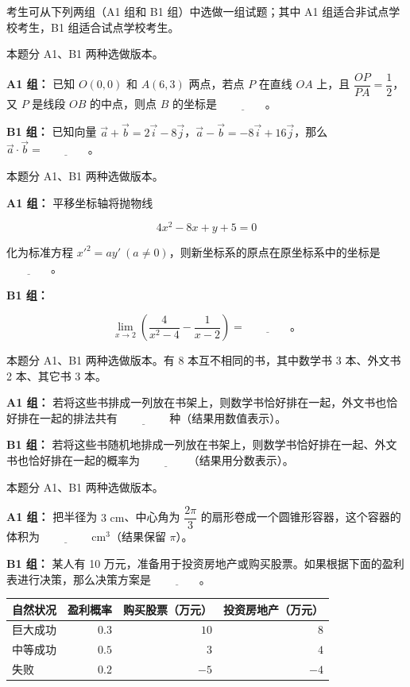 考生可从下列两组（A1 组和 B1 组）中选做一组试题；其中 A1 组适合非试点学校考生，B1 组适合试点学校考生。

\begin{question}
本题分 A1、B1 两种选做版本。

\textbf{A1 组：} 已知 $O(0,0)$ 和 $A(6,3)$ 两点，若点 $P$ 在直线 $OA$ 上，且 $\dfrac{OP}{PA}=\dfrac12$，又 $P$ 是线段 $OB$ 的中点，则点 $B$ 的坐标是 $\underline{\qquad\qquad}$。

\textbf{B1 组：} 已知向量 $\vec a+\vec b=2\vec i-8\vec j$，$\vec a-\vec b=-8\vec i+16\vec j$，那么 $\vec a\cdot\vec b=\underline{\qquad\qquad}$。

\end{question}
\begin{question}
本题分 A1、B1 两种选做版本。

\textbf{A1 组：} 平移坐标轴将抛物线

\nopagebreak[4]
\[
4x^2-8x+y+5=0
\]

化为标准方程 $x'^2=ay'\ (a\ne0)$，则新坐标系的原点在原坐标系中的坐标是 $\underline{\qquad\qquad}$。

\textbf{B1 组：}

\nopagebreak[4]
\[
\lim_{x\to2}\left(\dfrac{4}{x^2-4}-\dfrac{1}{x-2}\right)=\underline{\qquad\qquad}\text{。}
\]

\end{question}
\begin{question}
本题分 A1、B1 两种选做版本。有 8 本互不相同的书，其中数学书 3 本、外文书 2 本、其它书 3 本。

\textbf{A1 组：} 若将这些书排成一列放在书架上，则数学书恰好排在一起，外文书也恰好排在一起的排法共有 $\underline{\qquad\qquad}$ 种（结果用数值表示）。

\textbf{B1 组：} 若将这些书随机地排成一列放在书架上，则数学书恰好排在一起、外文书也恰好排在一起的概率为 $\underline{\qquad\qquad}$（结果用分数表示）。

\end{question}
\begin{question}
本题分 A1、B1 两种选做版本。

\textbf{A1 组：} 把半径为 $3\text{ cm}$、中心角为 $\dfrac{2\pi}{3}$ 的扇形卷成一个圆锥形容器，这个容器的体积为 $\underline{\qquad\qquad}\text{ cm}^3$（结果保留 $\pi$）。

\textbf{B1 组：} 某人有 10 万元，准备用于投资房地产或购买股票。如果根据下面的盈利表进行决策，那么决策方案是 $\underline{\qquad\qquad}$。

\begin{center}
\begin{tabular}{lrrr}
\toprule
自然状况 & 盈利概率 & 购买股票（万元） & 投资房地产（万元） \\
\midrule
巨大成功 & $0.3$ & $10$ & $8$ \\
中等成功 & $0.5$ & $3$ & $4$ \\
失败 & $0.2$ & $-5$ & $-4$ \\
\bottomrule
\end{tabular}
\end{center}

\end{question}

